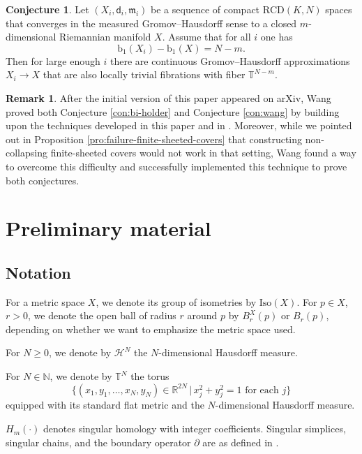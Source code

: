 \documentclass[12pt]{amsart}
\theoremstyle{definition}
\def\fnum{equation}
\newtheorem{conjecture}[\fnum]{Conjecture}
\newtheorem{remark}[\fnum]{Remark}
\numberwithin{equation}{section}
\newcommand{\bet}{\text{b}_1}
\newcommand{\iso}{\text{Iso}}
\newcommand{\rcd}{\text{RCD}}
\newcommand{\mm}{\mathfrak{m}}
\begin{document}
    
\begin{conjecture}
    Let $(X_i, \mathsf{d}_i, \mm_i)$ be a sequence of compact $\rcd(K,N)$ spaces that converges in the measured Gromov--Hausdorff sense to a closed $m$-dimensional Riemannian manifold $X$. Assume that for all $i$ one has
    \[  \bet (X_i) - \bet (X) = N - m . \]
    Then  for large enough $i$ there are continuous Gromov--Hausdorff approximations $X_i \to X$ that are also locally trivial fibrations with fiber $\mathbb{T}^{N - m}$.
\end{conjecture}
  


\begin{remark}
After the initial version of this paper appeared on arXiv, Wang \cite{wang} proved both Conjecture \ref{con:bi-holder} and Conjecture \ref{con:wang} by building upon the techniques developed in this paper and in \cite{zamora-limits}. Moreover, while we pointed out in Proposition \ref{pro:failure-finite-sheeted-covers} that constructing non-collapsing finite-sheeted covers would not work in that setting, Wang found a way to overcome this difficulty and successfully implemented this technique to prove both conjectures.

\end{remark}






\section{Preliminary material}\label{sec:prelims}

\subsection{Notation}  For a metric space $X$, we denote its group of isometries by $\iso (X)$. For $p \in X$, $r > 0$, we denote the open ball of radius $r$ around $p$ by $B_r^X(p)$ or $B_r(p)$, depending on whether we want to emphasize the metric space used.

For $N \geq 0 $, we denote by $\mathcal{H}^N$ the $N$-dimensional Hausdorff measure.

For $N \in \mathbb{N}$, we denote by 
$ \mathbb{T}^N$ the torus 
\[\{ (x_1, y_1, \ldots , x_N, y_N) \in \mathbb{R}^{2N}  \, \vert  \,   x_j ^2  + y_j ^2 = 1 \text{ for each } j  \}\]
equipped with its standard flat metric and the $N$-dimensional Hausdorff measure.

$H_m (\cdot )$ denotes singular homology with integer coefficients. Singular simplices, singular chains, and the boundary operator $\partial$ are as defined in \cite[Chapter 2]{hatcher}.
\end{document}
